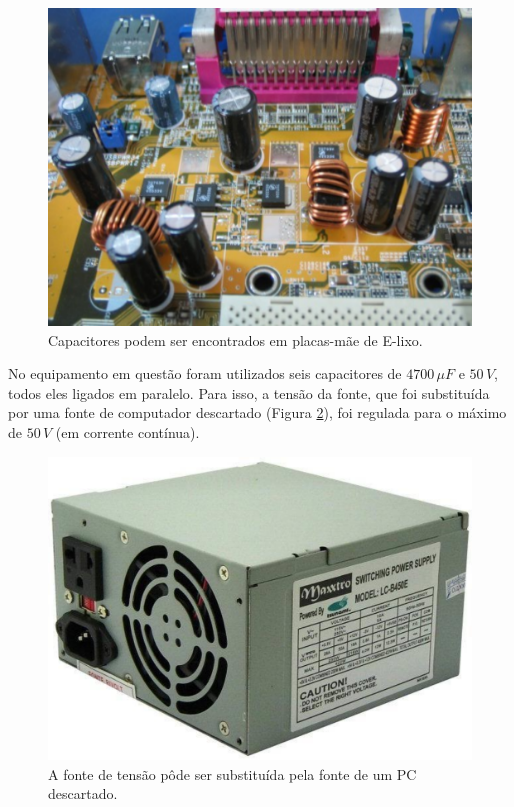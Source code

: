 \documentclass[a4paper]{ifacconf}
\begin{document}
\begin{figure}[h]
	\centering
	\includegraphics[scale=0.2]{figuras/capacitores.pdf}
	\caption{Capacitores podem ser encontrados em placas-mãe de E-lixo.}  \label{fig:capacitores} 
\end{figure}

No equipamento em questão foram utilizados seis capacitores de $4700 \,\mu F$ e $50\,V$, todos eles ligados em paralelo. Para isso, a tensão da fonte, que foi substituída por uma fonte de computador descartado (Figura \ref{fig:fonte}), foi regulada para o máximo de $50\,V$ (em corrente contínua). 

\begin{figure}
	\centering
	\includegraphics[scale=0.1]{figuras/fonte.pdf}
	\caption{A fonte de tensão pôde ser substituída pela fonte de um PC descartado.}  \label{fig:fonte} 
\end{figure}
\end{document}
